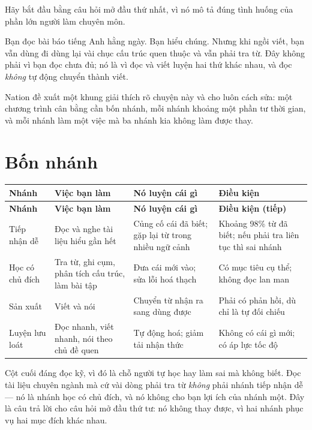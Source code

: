\documentclass[../../english.tex]{subfiles}
\begin{document}
Hãy bắt đầu bằng câu hỏi mở đầu thứ nhất, vì nó mô tả đúng tình huống của phần lớn người làm chuyên môn.

Bạn đọc bài báo tiếng Anh hằng ngày. Bạn hiểu chúng. Nhưng khi ngồi viết, bạn vẫn dùng đi dùng lại vài chục cấu trúc quen thuộc và vẫn phải tra từ. Đây không phải vì bạn đọc chưa đủ; nó là vì đọc và viết luyện hai thứ khác nhau, và đọc \emph{không} tự động chuyển thành viết.

Nation đề xuất một khung giải thích rõ chuyện này và cho luôn cách sửa: một chương trình cân bằng cần bốn nhánh, mỗi nhánh khoảng một phần tư thời gian, và mỗi nhánh làm một việc mà ba nhánh kia không làm được thay.

\section{Bốn nhánh}

\begin{center}\footnotesize
{}
\begin{longtable}{@{}L{2.9cm}L{4.3cm}L{4.0cm}L{3.6cm}@{}}
\toprule
\textbf{Nhánh} & \textbf{Việc bạn làm} & \textbf{Nó luyện cái gì} & \textbf{Điều kiện}\\
\midrule
\endfirsthead
\toprule
\textbf{Nhánh} & \textbf{Việc bạn làm} & \textbf{Nó luyện cái gì} & \textbf{Điều kiện (tiếp)}\\
\midrule
\endhead
Tiếp nhận dễ & Đọc và nghe tài liệu hiểu gần hết & Củng cố cái đã biết; gặp lại từ trong nhiều ngữ cảnh & Khoảng 98\% từ đã biết; nếu phải tra liên tục thì sai nhánh\\
Học có chủ đích & Tra từ, ghi cụm, phân tích cấu trúc, làm bài tập & Đưa cái mới vào; sửa lỗi hoá thạch & Có mục tiêu cụ thể; không đọc lan man\\
Sản xuất & Viết và nói & Chuyển từ nhận ra sang dùng được & Phải có phản hồi, dù chỉ là tự đối chiếu\\
Luyện lưu loát & Đọc nhanh, viết nhanh, nói theo chủ đề quen & Tự động hoá; giảm tải nhận thức & Không có cái gì mới; có áp lực tốc độ\\
\bottomrule
\end{longtable}
\end{center}

Cột cuối đáng đọc kỹ, vì đó là chỗ người tự học hay làm sai mà không biết. Đọc tài liệu chuyên ngành mà cứ vài dòng phải tra từ \emph{không} phải nhánh tiếp nhận dễ --- nó là nhánh học có chủ đích, và nó không cho bạn lợi ích của nhánh một. Đây là câu trả lời cho câu hỏi mở đầu thứ tư: nó không thay được, vì hai nhánh phục vụ hai mục đích khác nhau.
\end{document}
